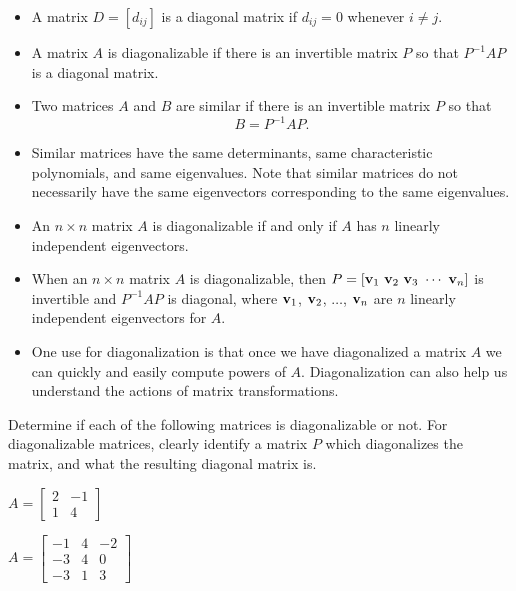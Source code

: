 \begin{itemize}
\item A matrix $D = [d_{ij}]$ is a diagonal matrix if $d_{ij} = 0$ whenever $i \neq j$.
\item A matrix $A$ is diagonalizable if there is an invertible matrix $P$ so that $P^{-1}AP$ is a diagonal matrix.
\item Two matrices $A$ and $B$ are similar if there is an invertible matrix $P$ so that 
\[B = P^{-1}AP.\]
\item Similar matrices have the same determinants, same characteristic polynomials, and same eigenvalues. Note that similar matrices do not necessarily have the same eigenvectors corresponding to the same eigenvalues. 
\item An $n \times n$ matrix $A$ is diagonalizable if and only if $A$ has $n$ linearly independent eigenvectors.
\item When an $n \times n$ matrix $A$ is diagonalizable, then $P = [ \vv_1  \ \vv_2  \ \vv_3  \ \cdots  \ \vv_n]$ is invertible and $P^{-1}AP$ is diagonal, where $\mathbf{v}_1$, $\mathbf{v}_2$, $\ldots$, $\mathbf{v}_n$ are $n$ linearly independent eigenvectors for $A$.
\item One use for diagonalization is that once we have diagonalized a matrix $A$ we can quickly and easily compute powers of $A$. Diagonalization can also help us understand the actions of matrix transformations. 
\end{itemize}



\be
\item Determine if each of the following matrices is diagonalizable or not. For diagonalizable matrices, clearly identify a matrix $P$ which diagonalizes the matrix, and what the resulting diagonal matrix is.
\ba
\item $A=\left[ \begin{array}{cr} 2&-1\\ 1&4 \end{array} \right]$

\item $A=\left[ \begin{array}{rcr} -1 & 4 & -2 \\ -3 & 4 & 0 \\ -3 & 1 & 3 \end{array} \right]$
\ea


